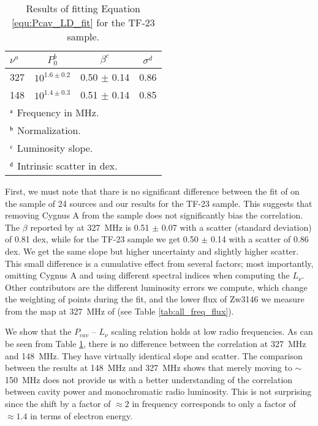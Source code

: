 \documentclass{aa}  %
\begin{document}
\begin{table}[ht]
	\begin{center}
	\caption{Results of fitting Equation \ref{equ:Pcav_LD_fit} for the TF-23 sample.}%
	\begin{tabular}{l c c c }
		\hline
		\hline
		$\nu^{a}$		&	$P_{0}^{b}$		&	$\beta^{c}$		&	$\sigma^{d}$\\
		\hline
		327			&	$10^{1.6 \pm 0.2}$		& 	0.50 $\pm$ 0.14		&	0.86	 \\
		148			&	$10^{1.4 \pm 0.3}$ 	&  0.51 $\pm$ 0.14 	&	0.85	 \\			
		\hline	
		\multicolumn{4}{l}{$\rm{^a}$ Frequency in MHz.} \\
		\multicolumn{4}{l}{$\rm{^b}$ Normalization.} \\
		\multicolumn{4}{l}{$\rm{^c}$ Luminosity slope.} \\
		\multicolumn{4}{l}{$\rm{^d}$ Intrinsic scatter in dex.} \\
	\end{tabular}
	\label{tab:regression}
	\end{center}
\end{table}



First, we must note that thare is no significant difference between the fit of \cite{Birzan2008} on the sample of 24 sources and our results for the TF-23 sample.
This suggests that removing Cygnus A from the sample does not significantly bias the correlation.
The $\beta$ reported by \cite{Birzan2008} at 327~MHz is 0.51 $\pm$ 0.07 with a scatter (standard deviation) of 0.81 dex, while for the TF-23 sample we get 0.50 $\pm$ 0.14 with a scatter of 0.86 dex.
We get the same slope but higher uncertainty and slightly higher scatter. This small difference is a cumulative effect from several factors; most importantly, omitting Cygnus A and using different spectral indices when computing the $L_{\nu}$.
Other contributors are the different luminosity errors we compute, which change the weighting of points during the fit, and the lower flux of Zw3146 we measure from the map at 327~MHz of \cite{Birzan2008} (see Table \ref{tab:all_freq_flux}).   

We show that the $P_{cav}$ -- $L_{\nu}$ scaling relation holds at low radio frequencies.
As can be seen from Table \ref{tab:regression}, there is no difference between the correlation at 327~MHz and 148~MHz. They have virtually identical slope and scatter. 
The comparison between the results at 148~MHz and 327~MHz shows that merely moving to $\sim$150~MHz does not provide us with a better understanding of the correlation between cavity power and monochromatic radio luminosity. 
This is not surprising since the shift by a factor of $\approx2$ in frequency corresponds to only a factor of $\approx1.4$ in terms of electron energy.
\end{document}
